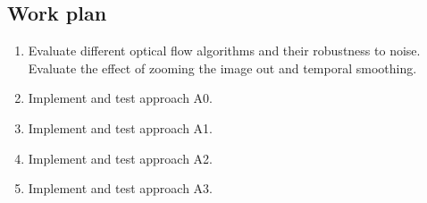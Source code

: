 \documentclass[a4paper,10pt]{article}
\begin{document}
\bigskip

\bigskip


\subsection*{Work plan}

\begin{enumerate}
	\item Evaluate different optical flow algorithms and their
		robustness to noise. Evaluate the effect of zooming the image
		out and temporal smoothing.
	\item Implement and test approach A0.
	\item Implement and test approach A1.
	\item Implement and test approach A2.
	\item Implement and test approach A3.
\end{enumerate}
\end{document}
